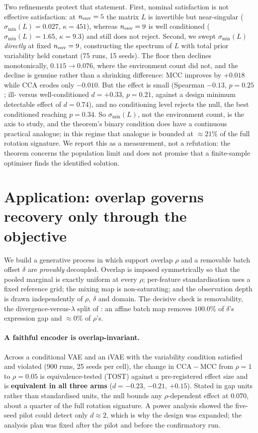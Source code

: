 \documentclass[10pt]{article}
\newcommand{\gap}{\ensuremath{\mathrm{CCA}\!-\!\mathrm{MCC}}}
\newcommand{\smin}{\ensuremath{\sigma_{\min}(L)}}
\begin{document}
Two refinements protect that statement. First, nominal satisfaction is not effective satisfaction: at
$n_{\rm env}=5$ the matrix $L$ is invertible but near-singular ($\smin=0.027$, $\kappa=451$), whereas
$n_{\rm env}=9$ is well conditioned ($\smin=1.65$, $\kappa=9.3$) and still does not reject. Second, we
swept $\smin$ \emph{directly} at fixed $n_{\rm env}=9$, constructing the spectrum of $L$ with total
prior variability held constant (75 runs, 15 seeds). The floor then declines monotonically,
$0.115\to0.076$, where the environment count did not, and the decline is genuine rather than a
shrinking difference: MCC improves by $+0.018$ while CCA erodes only $-0.010$. But the effect is small
(Spearman $-0.13$, $p=0.25$; ill- versus well-conditioned $d=+0.33$, $p=0.21$, against a design
minimum detectable effect of $d=0.74$), and no conditioning level rejects the null, the best conditioned
reaching $p=0.34$. So $\smin$, not the environment count, is the axis to study, and the theorem's binary
condition does have a continuous practical analogue; in this regime that analogue is bounded at
$\approx21\%$ of the full rotation signature. We report this as a measurement, not a refutation: the
theorem concerns the population limit and does not promise that a finite-sample optimiser finds the
identified solution.

\section{Application: overlap governs recovery only through the objective}
\label{sec:app}

We build a generative process in which support overlap $\rho$ and a removable batch offset $\delta$ are
\emph{provably} decoupled. Overlap is imposed symmetrically so that the pooled marginal is exactly
uniform at every $\rho$; per-feature standardisation uses a fixed reference grid; the mixing map is
non-saturating; and the observation depth is drawn independently of $\rho$, $\delta$ and domain. The
decisive check is removability, the divergence-versus-$\lambda$ split of \citet{bendavid2010theory}: an
affine batch map removes $100.0\%$ of $\delta$'s expression gap and $\approx0\%$ of $\rho$'s.

\paragraph{A faithful encoder is overlap-invariant.} Across a conditional VAE and an iVAE with the
variability condition satisfied and violated (900 runs, 25 seeds per cell), the change in $\gap$ from
$\rho=1$ to $\rho=0.05$ is equivalence-tested (TOST) against a pre-registered effect size and is
\textbf{equivalent in all three arms} ($d=-0.23$, $-0.21$, $+0.15$). Stated in gap units rather than
standardised units, the null bounds any $\rho$-dependent effect at $0.070$, about a quarter of the full
rotation signature. A power analysis showed the five-seed pilot could detect only $d\approx2$, which is
why the design was expanded; the analysis plan was fixed after the pilot and before the confirmatory
run.
\end{document}
